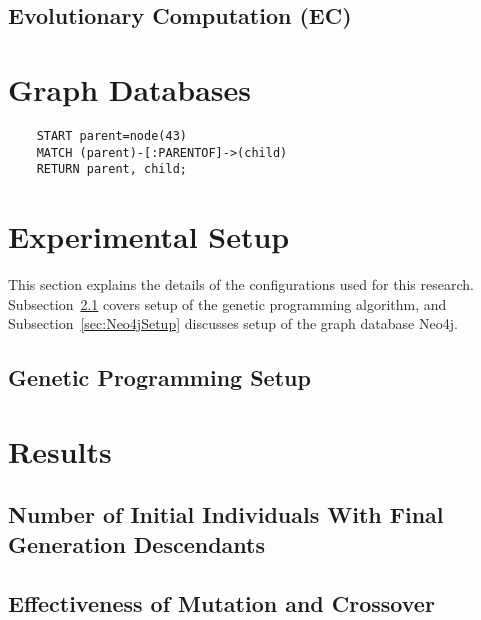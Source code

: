 \documentclass[12pt]{article}
\begin{document}
\subsection{Evolutionary Computation (EC)}
\label{sec:EC}



\section{Graph Databases}
\label{sec:Graph Databases}



\begin{verbatim}
    START parent=node(43)
    MATCH (parent)-[:PARENTOF]->(child)
    RETURN parent, child;
\end{verbatim}


\section{Experimental Setup} 
\label{sec:experiments}

This section explains the details of the configurations used for this research. Subsection~\ref{sec:GPSetup} covers setup of the genetic programming algorithm, and Subsection~\ref{sec:Neo4jSetup} discusses setup of the graph database Neo4j.

\subsection{Genetic Programming Setup}
\label{sec:GPSetup}


\section{Results} \label{sec:results}



\subsection{Number of Initial Individuals With Final Generation Descendants}
\label{sec:numberInitialIndividualsWithDescendants}



\subsection{Effectiveness of Mutation and Crossover}
\label{sec:effectivenessMutationCrossover}
\end{document}
